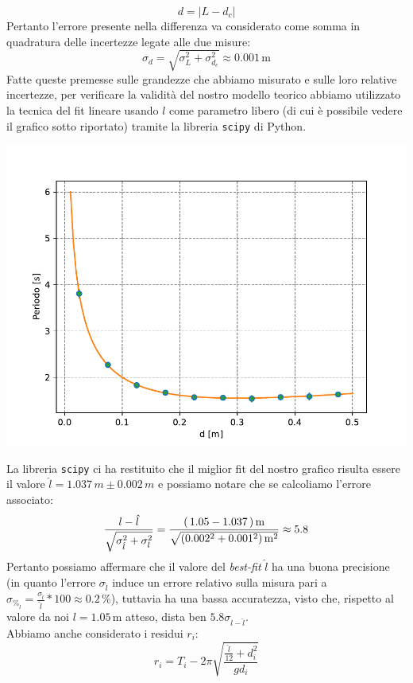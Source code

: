 \documentclass{article}
\begin{document}
$$
	d = | L - d_c |
$$
Pertanto l'errore presente nella differenza va considerato come somma in quadratura delle incertezze legate alle due misure:
$$
	\sigma_d = \sqrt{\sigma_L^2 + \sigma_{d_c}^2} \approx 0.001 \, \text{m}
$$
Fatte queste premesse sulle grandezze che abbiamo misurato e sulle loro relative incertezze, per verificare la validità del nostro modello teorico abbiamo utilizzato la tecnica del fit lineare usando $l$ come parametro libero (di cui è possibile vedere il grafico sotto riportato) tramite la libreria \texttt{scipy} di Python. \\
\begin{minipage}{0.4\textwidth}
	\includegraphics[scale=0.6]{grafico_fit.pdf}
\end{minipage}
\hspace{0.2\textwidth}
\begin{minipage}{0.4\textwidth}

La libreria \texttt{scipy} ci ha restituito che il miglior fit del nostro grafico risulta essere il valore $\hat{l} = 1.037 \, m \pm 0.002 \, m$ e possiamo notare che se calcoliamo l'errore associato:
$$
	\frac{l - \hat{l}}{\sqrt{\sigma^2_{\hat{l}} + \sigma^2_{l}}} = \\ \frac{(\, 1.05 - 1.037 \, ) \, \text{m}}{\sqrt{(0.002^2 + 0.001^2) \, \text{m}^2}} \approx \\ 5.8
$$
Pertanto possiamo affermare che il valore del \emph{best-fit} $\hat{l}$ ha una buona precisione (in quanto l'errore $\sigma_{\hat{l}}$ induce un errore relativo sulla misura pari a $\sigma_{\%_{\hat{l}}} = \frac{\sigma_{\hat{l}}}{\hat{l}} * 100 \approx 0.2 \, \% $), tuttavia ha una bassa accuratezza, visto che, rispetto al valore da noi $l=1.05 \, \text{m}$ atteso, dista ben $5.8\sigma_{l-\hat{l}}$. \\
Abbiamo anche considerato i residui $r_{i}$:
\begin{equation}
	r_i = T_i - 2\pi\sqrt{\frac{\frac{\hat{l}}{12} + d_i^2}{gd_i}}
\end{equation}
\end{minipage}
\end{document}
